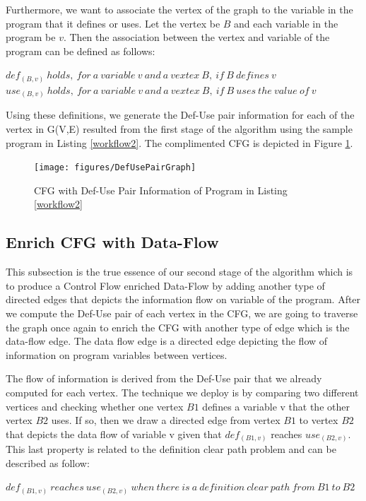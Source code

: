 Furthermore, we want to associate the vertex of the graph to the variable in the program that it defines or uses. Let the vertex be $B$ and each variable in the program be $v$. Then the association between the vertex and variable of the program can be defined as follows:

\begin{algorithmic}
\State$def_{(B,v)}\:holds,\:for\:a\:variable\:v\:and\:a\:vextex\:B,\:if\:B\:defines\:v$
\State$use_{(B,v)}\:holds,\:for\:a\:variable\:v\:and\:a\:vextex\:B,\:if\:B\:uses\:the\:value\:of\:v$
\end{algorithmic}

Using these definitions, we generate the Def-Use pair information for each of the vertex in G(V,E) resulted from the first stage of the algorithm using the sample program in Listing \ref{workflow2}. The complimented CFG is depicted in Figure \ref{fig:DefUseGraph}.

\begin{figure}[h!]
\centering
\texttt{[image: figures/DefUsePairGraph]}
\caption{CFG with Def-Use Pair Information of Program in Listing \ref{workflow2}}
\label{fig:DefUseGraph}
\end{figure}
 
\subsection{Enrich CFG with Data-Flow}
This subsection is the true essence of our second stage of the algorithm which is to produce a Control Flow enriched Data-Flow by adding another type of directed edges that depicts the information flow on variable of the program. After we compute the Def-Use pair of each vertex in the CFG, we are going to traverse the graph once again to enrich the CFG with another type of edge which is the data-flow edge. The data flow edge is a directed edge depicting the flow of information on program variables between vertices.

The flow of information is derived from the Def-Use pair that we already computed for each vertex. The technique we deploy is by comparing two different vertices and checking whether one vertex $B1$ defines a variable v that the other vertex $B2$ uses. If so, then we draw a directed edge from vertex $B1$ to vertex $B2$ that depicts the data flow of variable v given that $def_{(B1,v)}$ reaches $use_{(B2,v)}$. This last property is related to the definition clear path problem and can be described as follow: 
\begin{algorithmic}
\State$def_{(B1,v)}\:reaches\:use_{(B2,v)}\:when\:there\:is\:a\:definition\:clear\:path\:from\:B1\:to\:B2$
\end{algorithmic}

